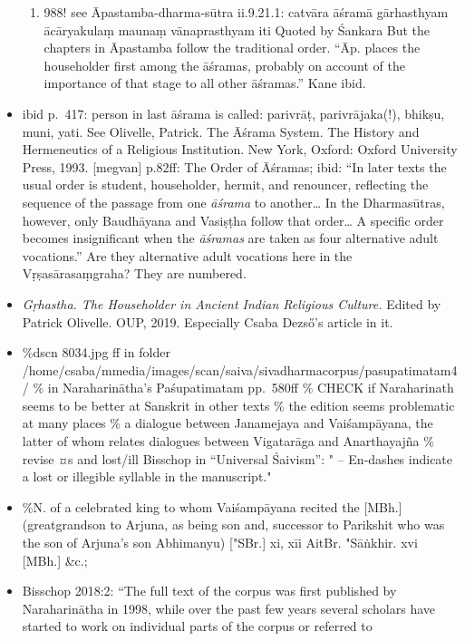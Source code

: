\documentclass[12pt]{book}
\begin{document}
\begin{itemize}
\begin{enumerate}
  \item
    988! see Āpastamba-dharma-sūtra ii.9.21.1: catvāra āśramā
    gārhasthyam ācāryakulaṃ maunaṃ vānaprasthyam iti\textbar{} Quoted by
    Śankara But the chapters in Āpastamba follow the traditional order.
    ``Āp. places the householder first among the āśramas, probably on
    account of the importance of that stage to all other āśramas.'' Kane
    ibid.
  \end{enumerate}
\item
  ibid p.~417: person in last āśrama is called: parivrāṭ,
  parivrājaka(!), bhikṣu, muni, yati. See Olivelle, Patrick. The Āśrama
  System. The History and Hermeneutics of a Religious Institution. New
  York, Oxford: Oxford University Press, 1993. {[}megvan{]} p.82ff: The
  Order of Āśramas; ibid: ``In later texts the usual order is student,
  householder, hermit, and renouncer, reflecting the sequence of the
  passage from one \emph{āśrama} to another\ldots{} In the Dharmasūtras,
  however, only Baudhāyana and Vasiṣṭha follow that order\ldots{} A
  specific order becomes insignificant when the \emph{āśramas} are taken
  as four alternative adult vocations.'' Are they alternative adult
  vocations here in the Vṛṣasārasaṃgraha? They are numbered.
\item
  \textit{Gṛhastha. The Householder in Ancient Indian 
      Religious Culture.} Edited by Patrick Olivelle. OUP, 2019.
  Especially Csaba Dezső's article in it.
\item
  \%dscn 8034.jpg ff in folder
  /home/csaba/mmedia/images/scan/saiva/sivadharmacorpus/pasupatimatam4/
  \% in Naraharinātha's Paśupatimatam pp.~580ff \% CHECK if Naraharinath
  seems to be better at Sanskrit in other texts \% the edition seems
  problematic at many places \% a dialogue between Janamejaya and
  Vaiśampāyana, the latter of whom relates dialogues between Vigatarāga
  and Anarthayajña \% revise ¤s and lost/ill Bisschop in ``Universal
  Śaivism'': " -- En-dashes indicate a lost or illegible syllable in the
  manuscript."
\item
  \%N. of a celebrated king to whom Vaiśampāyana recited the {[}MBh.{]}
  (greatgrandson to Arjuna, as being son and, successor to Parikshit who
  was the son of Arjuna's son Abhimanyu) {[}"SBr.{]} xi, xīi AitBr.
  "Sāṅkhir. xvi {[}MBh.{]} \&c.;
\item
  Bisschop 2018:2: ``The full text of the corpus was first published by
  Naraharinātha in 1998, while over the past few years several scholars
  have started to work on individual parts of the corpus or referred to

\end{itemize}
\end{document}

